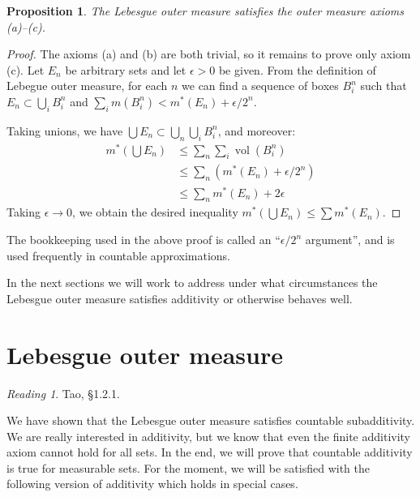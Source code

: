 \documentclass[11pt,oneside]{amsbook}
\DeclareMathOperator{\vol}{vol}
\theoremstyle{definition}
\theoremstyle{plain}
\newtheorem{prop}[thm]{Proposition}
\theoremstyle{definition}
\theoremstyle{remark}
\newtheorem*{reading}{Reading}
\numberwithin{equation}{section}
\numberwithin{figure}{section}
\begin{document}
\begin{prop}
  The Lebesgue outer measure satisfies the outer measure axioms (a)--(c).
\end{prop}

\begin{proof}
  The axioms (a) and (b) are both trivial, so it remains to prove only axiom (c). Let $E_n$ be arbitrary sets and let $\epsilon>0$ be given. From the definition of Lebegue outer measure, for each $n$ we can find a sequence of boxes $B_i^n$ such that $E_n\subset\bigcup_iB_i^n$ and $\sum_im(B_i^n)<m^*(E_n)+\epsilon/2^n$.

  Taking unions, we have $\bigcup E_n\subset\bigcup_n\bigcup_iB_i^n$, and moreover:
  \begin{align*}
    m^*(\bigcup E_n)&\leq\sum_n\sum_i\vol(B_i^n)\\
                    &\leq\sum_n\left(m^*(E_n)+\epsilon/2^n\right)\\
                    &\leq\sum_nm^*(E_n)+2\epsilon
  \end{align*}
  Taking $\epsilon\to0$, we obtain the desired inequality $m^*(\bigcup E_n)\leq\sum m^*(E_n)$.
\end{proof}

The bookkeeping used in the above proof is called an ``$\epsilon/2^n$ argument'', and is used frequently in countable approximations.

In the next sections we will work to address under what circumstances the Lebesgue outer measure satisfies additivity or otherwise behaves well.

\newpage
\section{Lebesgue outer measure}

\begin{reading}
  Tao, \S 1.2.1.
\end{reading}

We have shown that the Lebesgue outer measure satisfies countable subadditivity. We are really interested in additivity, but we know that even the finite additivity axiom cannot hold for all sets. In the end, we will prove that countable additivity is true for measurable sets. For the moment, we will be satisfied with the following version of additivity which holds in special cases.

\end{document}
